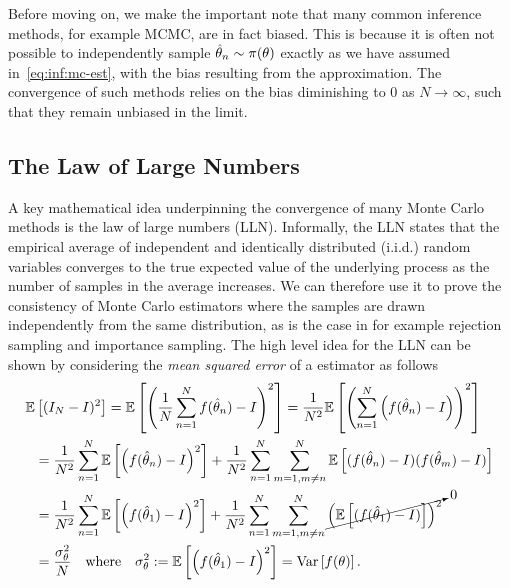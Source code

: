 Before moving
on, we make the important note that many common \mc inference methods, for example MCMC, are in fact biased.  
This is because it is often not possible to independently sample $\hat{\theta}_n \sim \pi(\theta)$
exactly as we have assumed in~\eqref{eq:inf:mc-est}, with the bias resulting from
the approximation.  The convergence of such methods relies on the bias 
diminishing to $0$ as $N\rightarrow\infty$, such that they remain unbiased in the limit.

\subsection{The Law of Large Numbers}
\label{sec:inf:mc:law}

A key mathematical idea underpinning the convergence of many Monte Carlo methods is the 
law of large numbers (LLN).  Informally, the LLN states that the empirical average of 
independent and identically distributed (i.i.d.)  random variables converges to 
the true expected value of the underlying process as the number of samples in the
average increases.  We can therefore use it to prove the consistency of Monte Carlo estimators
where the samples are drawn independently from the same distribution, as is the case
in for example rejection sampling and importance sampling.  The high level idea for the LLN can be shown by
considering the  \emph{mean squared error} of a \mc estimator as 
follows
\begin{align}
\mathbb{E} &\left[(I_N-I)^2\right] = \mathbb{E}\left[\left(\frac{1}{N}\sum_{n=1}^{N}f(\hat{\theta}_n) - I\right)^2\right]
= \frac{1}{N^2}\mathbb{E}\left[\left(\sum_{n=1}^{N} \left(f(\hat{\theta}_n) - I\right)\right)^2\right] \nonumber \\
&= \frac{1}{N^2}\sum_{n=1}^{N} \mathbb{E}\left[ \left(f(\hat{\theta}_n)-I\right)^2\right] + 
\frac{1}{N^2}\sum_{n=1}^{N}\sum_{m=1,m\neq n}^{N} \mathbb{E}\left[ (f(\hat{\theta}_n)-I)(f(\hat{\theta}_m)-I)\right] \nonumber \\
&= \frac{1}{N^2}\sum_{n=1}^{N} \mathbb{E}\left[ \left(f(\hat{\theta}_1)-I\right)^2\right] + 
\frac{1}{N^2}\sum_{n=1}^{N}\sum_{m=1,m\neq n}^{N} \cancelto{0}{\left(\mathbb{E}\left[(f(\hat{\theta}_1)-I)\right]\right)^2} \nonumber \\
&= \frac{\sigma_{\theta}^2}{N}  \quad \text{where} \quad \sigma_{\theta}^2 := \mathbb{E}\left[ \left(f(\hat{\theta}_1)-I\right)^2\right]
= \mathrm{Var} \left[f(\theta)\right].\label{eq:inf:LLN-informal}
\end{align}

